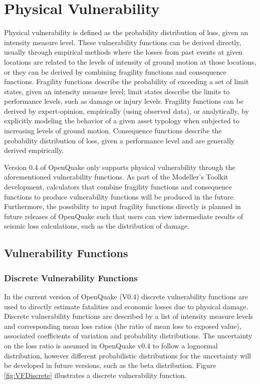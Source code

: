 \section{Physical Vulnerability}
Physical vulnerability is defined as the probability distribution of loss, given an intensity measure level. These vulnerability functions can be derived directly, usually through empirical methods where the losses from past events at given locations are related to the levels of intensity of ground motion at those locations, or they can be derived by combining fragility functions and consequence functions. Fragility functions describe the probability of exceeding a set of limit states, given an intensity measure level; limit states describe the limits to performance levels, such as damage or injury levels. Fragility functions can be derived by expert-opinion, empirically (using observed data), or analytically, by explicitly modeling the behavior of a given asset typology when subjected to increasing levels of ground motion. Consequence functions describe the probability distribution of loss, given a performance level and are generally derived empirically. 

Version 0.4 of OpenQuake only supports physical vulnerability through the aforementioned vulnerability functions. As part of the Modeller's Toolkit development, calculators that combine fragility functions and consequence functions to produce vulnerability functions will be produced in the future. Furthermore, the possibility to input fragility functions directly is planned in future releases of OpenQuake such that users can view intermediate results of seismic loss calculations, such as the distribution of damage. 

\subsection{Vulnerability Functions}
\subsubsection{Discrete Vulnerability Functions}
In the current version of OpenQuake (V0.4) discrete vulnerability functions are used to directly estimate fatalities and economic losses due to physical damage. Discrete vulnerability functions are described by a list of intensity measure levels and corresponding mean loss ratios (the ratio of mean loss to exposed value), associated coefficients of variation and probability distributions. The uncertainty on the loss ratio is assumed in OpenQuake v0.4 to follow a lognormal distribution, however different probabilistic distributions for the uncertainty will be developed in future versions, such as the beta distribution. Figure \ref{fig:VFDiscrete} illustrates a discrete vulnerability function.

